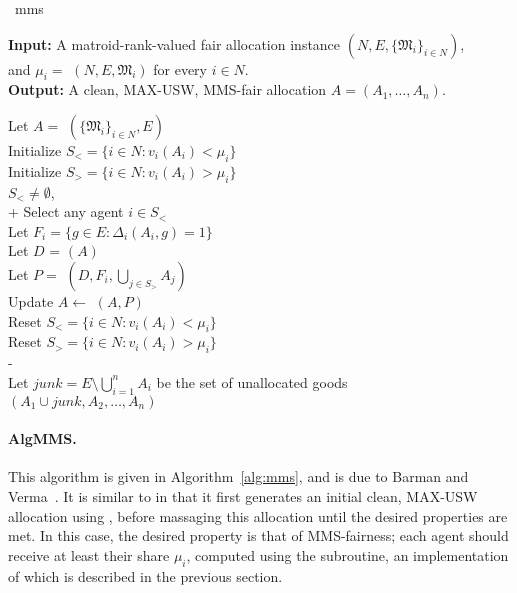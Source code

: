 \begin{algorithm}{~\cite{barman2021existence}}{mms}

\textbf{Input:}  \tab A matroid-rank-valued fair allocation instance $(N, E, \{\mathfrak{M}_i\}_{i\in N})$, \\
\mbox{}\tab and $\mu_i =$ $(N, E, \mathfrak{M}_i)$ for every $i\in N$.\\
\textbf{Output:} \tab A clean, MAX-USW, MMS-fair allocation $A = (A_1,\dots,A_n)$.

\begin{pseudo}[label=\small\arabic*, indent-mark]
Let $A =$ $(\{\mathfrak{M}_i\}_{i\in N}, E)$  \\
Initialize $S_< = \{ i\in N : v_i(A_i) < \mu_i \}$ \\
Initialize $S_> = \{ i\in N : v_i(A_i) > \mu_i \}$ \\
 $S_<\neq\emptyset$,   \\+
    Select any agent $i \in S_<$\\
    Let $F_i = \{ g\in E : \Delta_i(A_i, g) = 1 \}$ \\
    Let $D$ = $(A)$ \\
    Let $P =$ $(D, F_i, \bigcup_{j\in S_>}A_j)$ \\
    Update $A \leftarrow$ $(A,P)$ \\
    Reset $S_< = \{ i\in N : v_i(A_i) < \mu_i \}$ \\
    Reset $S_> = \{ i\in N : v_i(A_i) > \mu_i \}$ \\-
 \\
Let $junk = E \setminus \bigcup_{i=1}^n A_i$ be the set of unallocated goods \\
 $(A_1 \cup junk, A_2,\dots,A_n)$
\end{pseudo}
  
\end{algorithm}

\paragraph{AlgMMS.} This algorithm is given in Algorithm~\ref{alg:mms}, and is due to Barman and Verma~\cite{barman2021existence}. It is similar to  in that it first generates an initial clean, MAX-USW allocation using , before massaging this allocation until the desired properties are met. In this case, the desired property is that of MMS-fairness; each agent should receive at least their share $\mu_i$, computed using the  subroutine, an implementation of which is described in the previous section.

